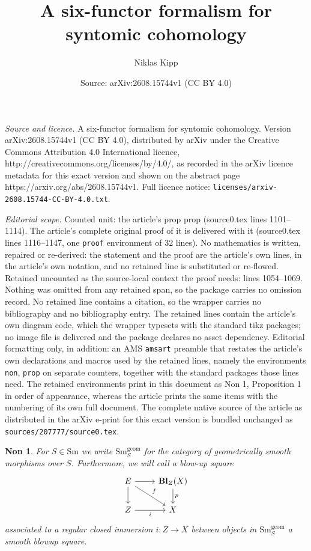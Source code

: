 \documentclass[10pt,a4paper]{amsart}
\title{A six-functor formalism for syntomic cohomology}
\author{Niklas Kipp}
\date{Source: arXiv:2608.15744v1 (CC BY 4.0)}
\newtheorem{non}{Non}
\newcommand{\Bl}{\mathbf{Bl}}
\newcommand{\Sm}{\text{Sm}}
\newcommand{\Smoo}{\text{Sm}}
\newcommand{\from}{\colon}
\begin{document}
\maketitle

\noindent\emph{Source and licence.} A six-functor formalism for syntomic cohomology. Version arXiv:2608.15744v1 (CC BY 4.0), distributed by arXiv under the Creative Commons Attribution 4.0 International licence, http://creativecommons.org/licenses/by/4.0/, as recorded in the arXiv licence metadata for this exact version and shown on the abstract page https://arxiv.org/abs/2608.15744v1. Full licence notice: \texttt{licenses/arxiv-2608.15744-CC-BY-4.0.txt}.\par\smallskip

\noindent\textit{Editorial scope.} Counted unit: the article's prop prop (source0.tex lines 1101--1114). The article's complete original proof of it is delivered with it (source0.tex lines 1116--1147, one \texttt{proof} environment of 32 lines). No mathematics is written, repaired or re-derived: the statement and the proof are the article's own lines, in the article's own notation, and no retained line is substituted or re-flowed.  Retained uncounted as the source-local context the proof needs: lines 1054--1069.  Nothing was omitted from any retained span, so the package carries no omission record.  No retained line contains a citation, so the wrapper carries no bibliography and no bibliography entry.  The retained lines contain the article's own diagram code, which the wrapper typesets with the standard tikz packages; no image file is delivered and the package declares no asset dependency.  Editorial formatting only, in addition: an AMS \texttt{amsart} preamble that restates the article's own declarations and macros used by the retained lines, namely the environments \texttt{non}, \texttt{prop} on separate counters, together with the standard packages those lines need.  The retained environments print in this document as Non 1, Proposition 1 in order of appearance, whereas the article prints the same items with the numbering of its own full document.  The complete native source of the article as distributed in the arXiv e-print for this exact version is bundled unchanged as \texttt{sources/207777/source0.tex}.
\begin{non}\label{blowup squares}
   For $S\in \Smoo$ we write $\Sm^{\text{geom}}_{S}$ for the category of geometrically
   smooth morphisms over $S$. Furthermore, we will call a blow-up square 
\[\begin{tikzcd}
	E & {\Bl_{Z}(X)} \\
	Z & X
	\arrow[from=1-1, to=1-2]
	\arrow[from=1-1, to=2-1]
	\arrow["p", from=1-2, to=2-2]
	\arrow["i"', from=2-1, to=2-2]
	\arrow["f", from=1-1, to=2-2]
\end{tikzcd}\]
   associated to a regular closed immersion $i\from Z\to X$ between objects in $\Sm^{\text{geom}}_{S}$ a \emph{smooth 
   blowup square}. 
\end{non}
\end{document}
